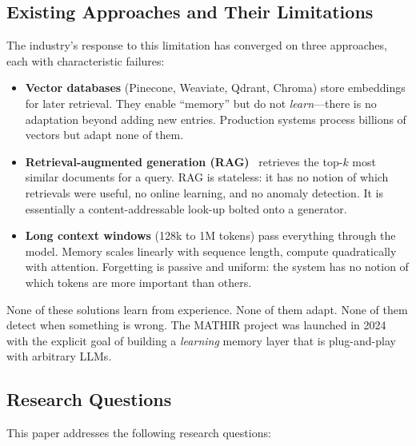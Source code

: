 \documentclass[12pt,a4paper]{article}
\theoremstyle{definition}
\theoremstyle{remark}
\newcommand{\MATHIR}{\textsc{MATHIR}}
\begin{document}
\subsection{Existing Approaches and Their Limitations}

The industry's response to this limitation has converged on three approaches, each with characteristic failures:

\begin{itemize}[leftmargin=2cm]
    \item \textbf{Vector databases} (Pinecone, Weaviate, Qdrant, Chroma) store embeddings for later retrieval. They enable ``memory'' but do not \emph{learn}---there is no adaptation beyond adding new entries. Production systems process billions of vectors but adapt none of them.
    \item \textbf{Retrieval-augmented generation (RAG)}~\cite{lewis2020} retrieves the top-$k$ most similar documents for a query. RAG is stateless: it has no notion of which retrievals were useful, no online learning, and no anomaly detection. It is essentially a content-addressable look-up bolted onto a generator.
    \item \textbf{Long context windows} (128k to 1M tokens) pass everything through the model. Memory scales linearly with sequence length, compute quadratically with attention. Forgetting is passive and uniform: the system has no notion of which tokens are more important than others.
\end{itemize}

None of these solutions learn from experience. None of them adapt. None of them detect when something is wrong. The \MATHIR{} project was launched in 2024 with the explicit goal of building a \textit{learning} memory layer that is plug-and-play with arbitrary LLMs.

\subsection{Research Questions}

This paper addresses the following research questions:
\end{document}
